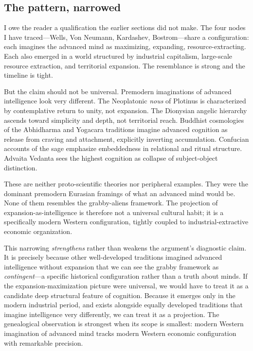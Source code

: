 \documentclass[11pt,a4paper,twocolumn]{article}
\begin{document}
\subsection{The pattern, narrowed}

I owe the reader a qualification the earlier sections did not make.
The four nodes I have traced---Wells, Von Neumann, Kardashev, Bostrom---share
a configuration: each imagines the advanced mind as maximizing,
expanding, resource-extracting. Each also emerged in a world structured
by industrial capitalism, large-scale resource extraction, and territorial
expansion. The resemblance is strong and the timeline is tight.

But the claim should not be universal. Premodern imaginations of
advanced intelligence look very different. The Neoplatonic \emph{nous}
of Plotinus is characterized by contemplative return to unity, not
expansion. The Dionysian angelic hierarchy ascends toward simplicity
and depth, not territorial reach. Buddhist cosmologies of the
Abhidharma and Yogacara traditions imagine advanced cognition as
release from craving and attachment, explicitly inverting
accumulation. Confucian accounts of the sage emphasize embeddedness
in relational and ritual structure. Advaita Vedanta sees the highest
cognition as collapse of subject-object distinction.

These are neither proto-scientific theories nor peripheral examples.
They were the dominant premodern Eurasian framings of what an
advanced mind would be. None of them resembles the grabby-aliens
framework. The projection of expansion-as-intelligence is therefore
not a universal cultural habit; it is a specifically modern Western
configuration, tightly coupled to industrial-extractive economic
organization.

This narrowing \emph{strengthens} rather than weakens the argument's
diagnostic claim. It is precisely because other well-developed
traditions imagined advanced intelligence without expansion that we
can see the grabby framework as \emph{contingent}---a specific
historical configuration rather than a truth about minds. If the
expansion-maximization picture were universal, we would have to treat
it as a candidate deep structural feature of cognition. Because it
emerges only in the modern industrial period, and exists alongside
equally developed traditions that imagine intelligence very
differently, we can treat it as a projection. The genealogical
observation is strongest when its scope is smallest: modern Western
imagination of advanced mind tracks modern Western economic
configuration with remarkable precision.
\end{document}
